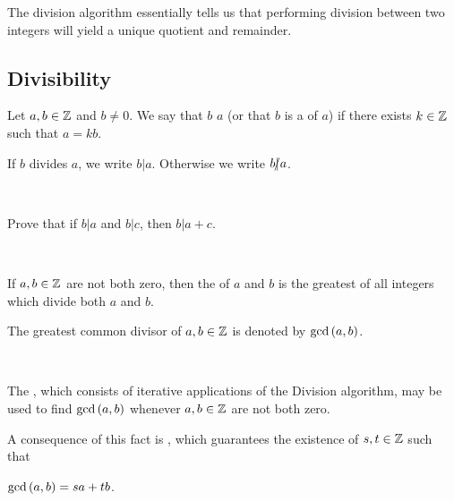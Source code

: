 \documentclass[11pt,fleqn,dvipsnames,usenames]{article}
\newcommand{\p}{\noindent}
\begin{document}
\p The division algorithm essentially tells us that performing division between two integers will yield a unique quotient and remainder.
\vsp

\subsection{Divisibility}

\begin{definition*} Let $a,b\in\mathbb{Z}$ and $b\neq 0$.  We say that $b$  $a$ (or that $b$ is a  of $a$) if there exists $k\in\mathbb{Z}$ such that $a = kb$.
\end{definition*}
\vsp

\notation If $b$ divides $a$, we write $b | a$.  Otherwise we write $b|\kern-0.9ex{/} a$.
\vsp

\begin{examples*}~
\vspace{2cm}

\end{examples*}
\newpage

\begin{example*}
Prove that if $b|a$ and $b|c$, then $b|a+c$.
\end{example*}
%
\begin{solution}~
\vspace{3cm}

\end{solution}
%
\begin{definition*} If $a,b\in\mathbb{Z}$ are not both zero, then the  of $a$ and $b$ is the greatest \nolinebreak of all integers which divide both $a$ and $b$.
\end{definition*}
\vsp

\notation The greatest common divisor of $a,b\in\mathbb{Z}$ is denoted by $\text{gcd}\left(a,b\right)$.
\vsp

\begin{example*}~
\vspace{1cm}

\end{example*}
%
\p The , which consists of iterative applications of the Division algorithm, may be used to find $\text{gcd}\left(a,b\right)$ whenever $a,b\in \mathbb{Z}$ are not both zero.
\vsp

\p A consequence of this fact is , which guarantees the existence of $s,t\in\mathbb{Z}$ such that \begin{center}
$\text{gcd}\left(a,b\right) = sa + tb$.
\end{center}
\vsp
\end{document}
